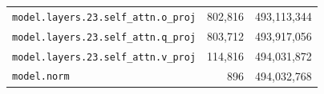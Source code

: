 \documentclass[10pt,a4paper]{article}
\theoremstyle{definition}
\begin{document}
\begin{appendices}
\begin{longtable}{p{9.5cm}rr}
\texttt{model.\allowbreak{}layers.\allowbreak{}23.\allowbreak{}self\_attn.\allowbreak{}o\_proj} & 802,816 & 493,113,344 \\
\texttt{model.\allowbreak{}layers.\allowbreak{}23.\allowbreak{}self\_attn.\allowbreak{}q\_proj} & 803,712 & 493,917,056 \\
\texttt{model.\allowbreak{}layers.\allowbreak{}23.\allowbreak{}self\_attn.\allowbreak{}v\_proj} & 114,816 & 494,031,872 \\
\texttt{model.\allowbreak{}norm} & 896 & 494,032,768 \\
\end{longtable}
\end{appendices}
\end{document}
